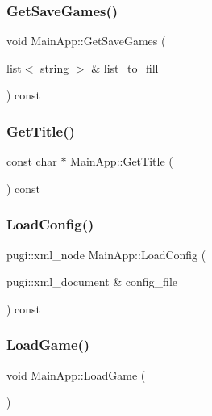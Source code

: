 \subsubsection{\texorpdfstring{GetSaveGames()}{GetSaveGames()}}
{\footnotesize\ttfamily void Main\+App\+::\+Get\+Save\+Games (\begin{DoxyParamCaption}\item[{list$<$ string $>$ \&}]{list\+\_\+to\+\_\+fill }\end{DoxyParamCaption}) const}

\mbox{\label{class_main_app_a0cb5a69066bd6d229e3e17a6e77a696a}} 
\subsubsection{\texorpdfstring{GetTitle()}{GetTitle()}}
{\footnotesize\ttfamily const char $\ast$ Main\+App\+::\+Get\+Title (\begin{DoxyParamCaption}{ }\end{DoxyParamCaption}) const}

\mbox{\label{class_main_app_a7da69d9070f9a2ca8c0fc975e4c3b9ab}} 
\subsubsection{\texorpdfstring{LoadConfig()}{LoadConfig()}}
{\footnotesize\ttfamily pugi\+::xml\+\_\+node Main\+App\+::\+Load\+Config (\begin{DoxyParamCaption}\item[{pugi\+::xml\+\_\+document \&}]{config\+\_\+file }\end{DoxyParamCaption}) const}

\mbox{\label{class_main_app_a40389ace217438c370f5539239d856ac}} 
\subsubsection{\texorpdfstring{LoadGame()}{LoadGame()}}
{\footnotesize\ttfamily void Main\+App\+::\+Load\+Game (\begin{DoxyParamCaption}{ }\end{DoxyParamCaption})}

